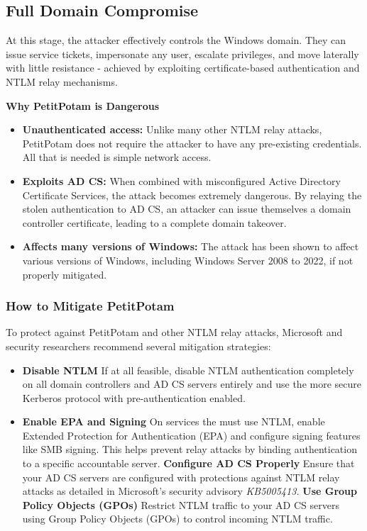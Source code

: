 \subsection*{Full Domain Compromise}
At this stage, the attacker effectively controls the Windows domain. They can issue service tickets, impersonate any user, escalate privileges, and move laterally with little resistance - achieved by exploiting certificate-based authentication and NTLM relay mechanisms.
    \begin{warningbox}
        \textbf{Why PetitPotam is Dangerous}
        \begin{itemize}
            \item \textbf{Unauthenticated access:} Unlike many other NTLM relay attacks, PetitPotam does not require the attacker to have any pre-existing credentials. All that is needed is simple network access.
            \item \textbf{Exploits AD CS:} When combined with misconfigured Active Directory Certificate Services, the attack becomes extremely dangerous. By relaying the stolen authentication to AD CS, an attacker can issue themselves a domain controller certificate, leading to a complete domain takeover.
            \item \textbf{Affects many versions of Windows:} The attack has been shown to affect various versions of Windows, including Windows Server 2008 to 2022, if not properly mitigated.
        \end{itemize}
    \end{warningbox}
    \subsubsection{How to Mitigate PetitPotam}
    To protect against PetitPotam and other NTLM relay attacks, Microsoft and security researchers recommend several mitigation strategies:
    \begin{itemize}
        \item \textbf{Disable NTLM}
        If at all feasible, disable NTLM authentication completely on all domain controllers and AD CS servers entirely and use the more secure Kerberos protocol with pre-authentication enabled.
        \item \textbf{Enable EPA and Signing}
        On services the must use NTLM, enable Extended Protection for Authentication (EPA) and configure signing features like SMB signing. This helps prevent relay attacks by binding authentication to a specific accountable server.
        \textbf{Configure AD CS Properly}
        Ensure that your AD CS servers are configured with protections against NTLM relay attacks as detailed in Microsoft's security advisory \textit{KB5005413.}
        \textbf{Use Group Policy Objects (GPOs)}
        Restrict NTLM traffic to your AD CS servers using Group Policy Objects (GPOs) to control incoming NTLM traffic.
    \end{itemize}

